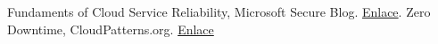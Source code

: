 


\begin{thebibliography}{1}
Fundaments of Cloud Service Reliability, Microsoft Secure Blog. \href{https://blogs.microsoft.com/microsoftsecure/2012/09/12/fundamentals-of-cloud-service-reliability/}{Enlace}.
Zero Downtime, CloudPatterns.org. \href{http://cloudpatterns.org/design_patterns/zero_downtime}{Enlace}
\end{thebibliography}

